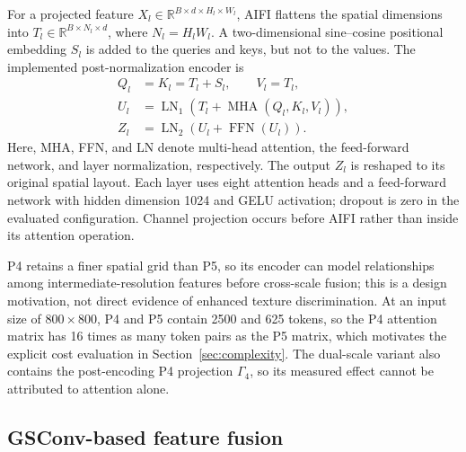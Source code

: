 \documentclass[pdflatex,sn-mathphys-num,iicol]{sn-jnl}
\begin{document}
For a projected feature $X_l\in\mathbb{R}^{B\times d\times H_l\times W_l}$, AIFI flattens the spatial dimensions into $T_l\in\mathbb{R}^{B\times N_l\times d}$, where $N_l=H_lW_l$. A two-dimensional sine--cosine positional embedding $S_l$ is added to the queries and keys, but not to the values. The implemented post-normalization encoder is
\begin{equation}
\begin{aligned}
 Q_l&=K_l=T_l+S_l,\qquad V_l=T_l,\\
 U_l&=\operatorname{LN}_1\!\left(T_l+\operatorname{MHA}(Q_l,K_l,V_l)\right),\\
 Z_l&=\operatorname{LN}_2\!\left(U_l+\operatorname{FFN}(U_l)\right).
\end{aligned}
\label{eq:aifi}
\end{equation}
Here, MHA, FFN, and LN denote multi-head attention, the feed-forward network, and layer normalization, respectively. The output $Z_l$ is reshaped to its original spatial layout. Each layer uses eight attention heads and a feed-forward network with hidden dimension 1024 and GELU activation; dropout is zero in the evaluated configuration. Channel projection occurs before AIFI rather than inside its attention operation.

P4 retains a finer spatial grid than P5, so its encoder can model relationships among intermediate-resolution features before cross-scale fusion; this is a design motivation, not direct evidence of enhanced texture discrimination. At an input size of $800\times800$, P4 and P5 contain 2500 and 625 tokens, so the P4 attention matrix has 16 times as many token pairs as the P5 matrix, which motivates the explicit cost evaluation in Section~\ref{sec:complexity}. The dual-scale variant also contains the post-encoding P4 projection $\Gamma_4$, so its measured effect cannot be attributed to attention alone.

\subsection{GSConv-based feature fusion}\label{sec:slimneck}
\end{document}
